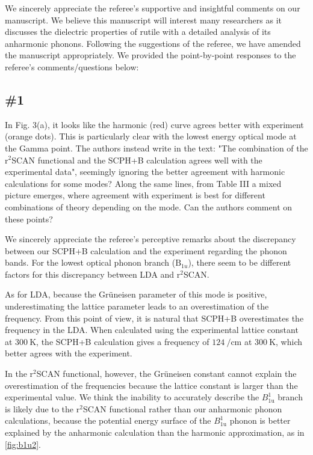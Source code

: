 \documentclass[luatex,onecolumn,showpacs,aps,preprint,prb,amsfonts,amsmath,amssymb,floatfix,groupedaddress, longbibliography]{revtex4-2}
\begin{document}
\AR We sincerely appreciate the referee’s supportive and insightful comments on our manuscript. We believe this manuscript will interest many researchers as it discusses the dielectric properties of rutile  with a detailed analysis of its anharmonic phonons. Following the suggestions of the referee, we have amended the manuscript appropriately. We provided the point-by-point responses to the referee’s comments/questions below:

\subsection{\#1}

\RC In Fig. 3(a), it looks like the harmonic (red) curve agrees better with experiment (orange dots). This is particularly clear with the lowest energy optical mode at the Gamma point. The authors instead write in the text: "The combination of the $\mathrm{r}^2$SCAN functional and the SCPH+B calculation agrees well with the experimental data", seemingly ignoring the better agreement with harmonic calculations for some modes? Along the same lines, from Table III a mixed picture emerges, where agreement with experiment is best for different combinations of theory depending on the mode. Can the authors comment on these points?

\AR  We sincerely appreciate the referee’s perceptive remarks about the discrepancy between our SCPH+B calculation and the experiment regarding the phonon bands. For the lowest optical phonon branch ($\mathrm{B}_{1u}$), there seem to be different factors for this discrepancy between LDA and $\mathrm{r}^2$SCAN. 

 As for LDA, because the Gr\"{u}neisen parameter of this mode is positive, underestimating the lattice parameter leads to an overestimation of the frequency. From this point of view, it is natural that SCPH+B overestimates the frequency in the LDA. When calculated using the experimental lattice constant at $\SI{300}{\kelvin}$, the SCPH+B calculation gives a frequency of $\SI{124}{\per\cm}$ at $\SI{300}{\kelvin}$, which better agrees with the experiment. 

In the $\mathrm{r}^2$SCAN functional, however, the Gr\"{u}neisen constant cannot explain the overestimation of the frequencies because the lattice constant is larger than the experimental value. We think the inability to accurately describe the $B_{\mathrm{1u}}^{1}$ branch is likely due to the $\mathrm{r}^2$SCAN functional rather than our anharmonic phonon calculations, because the potential energy surface of the $B_{\mathrm{1u}}^{1}$ phonon is better explained by the anharmonic calculation than the harmonic approximation, as in \cref{fig:b1u2}.
\end{document}
